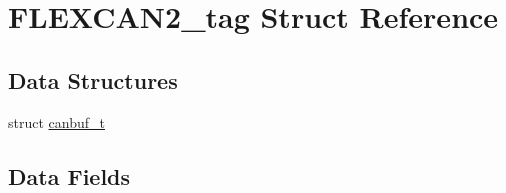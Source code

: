 \hypertarget{structFLEXCAN2__tag}{}\section{F\+L\+E\+X\+C\+A\+N2\+\_\+tag Struct Reference}
\label{structFLEXCAN2__tag}
\subsection*{Data Structures}
\begin{DoxyCompactItemize}
\item 
struct \mbox{\hyperlink{structFLEXCAN2__tag_1_1canbuf__t}{canbuf\+\_\+t}}
\end{DoxyCompactItemize}
\subsection*{Data Fields}
